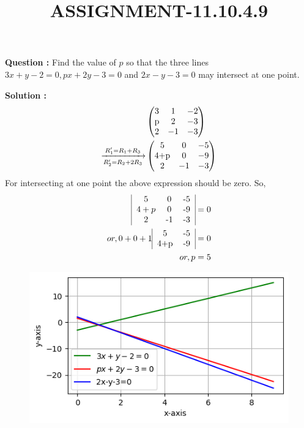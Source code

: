 \documentclass[12pt]{article}
\providecommand{\myvec}[1]{\ensuremath{\begin{pmatrix}#1\end{pmatrix}}}
\begin{document}
\title{\textbf{ASSIGNMENT-11.10.4.9}}
\date{}
\maketitle
\textbf{Question :} Find the value of $p$ so that the three lines $3x+y-2=0,px+2y-3=0$ and $2x-y-3=0$ may intersect at one point.


\textbf{Solution :}
\begin{align}  
&\myvec{
    3 &1&-2 \\
     $p$&2&-3\\
     2&-1&-3
}\\
\xrightarrow[R_2'=R_2+2R_3]{R_1'=R_1+R_3}&\myvec{
    5&0&-5\\
     $4+p$&0&-9\\
     2&-1&-3
}
\end{align}
For intersecting at one point the above expression should be zero.
So,
\begin{align}
 \begin{tabular}{|c c c|}
    5&0&-5\\
     $4+p$&0&-9\\
     2&-1&-3
\end{tabular}&=0\\
or,0+0+1\begin{tabular}{|c c|}
    5&-5  \\
    4+p &-9
\end{tabular}&=0\\
or,p&=5
\end{align}


\begin{figure}
    \centering
    \includegraphics[width=\columnwidth]{fig/11.10.4.9.png}
    \caption{}
    \label{11.10.4.9}
\end{figure}
\end{document}
